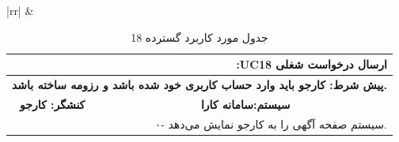 \documentclass[12pt]{article}
\begin{document}
\begin{center}
\begin{table}[H]
\begin{tabular}{|rr|}
			                    &                                                                                                                                                          \\ \hline

		\end{tabular}
	\end{table}

	\begin{table}[H]
		\caption{جدول مورد کاربرد گسترده 18}
		\label{tab:ext-uc18}
		\begin{tabular}{|rr|}
			\hline
			\multicolumn{2}{|r|}{\textbf{:UC18 ارسال درخواست شغلی}}                                                                                                                                                                                                                                                                                                                                                    \\ \hline
			\multicolumn{2}{|r|}{\textbf{پیش شرط: کارجو باید وارد حساب کاربری خود شده باشد و رزومه ساخته باشد.}}                                                                                                                                                                                                                                                                                                                               \\ \hline
			\multicolumn{1}{|c|}{\textbf{کنشگر: کارجو}}                                                                                                                                        & \multicolumn{1}{c|}{\textbf{سیستم:سامانه کارا}}                                                                                                                                                                                               \\ \hline
			\multicolumn{1}{|l|}{\textbf{}}                                                                                                                                                    & ۰- سیستم صفحه آگهی را به کارجو نمایش می‌دهد.                                                                                                                                                                                                  \\ \hline

\end{tabular}
\end{table}
\end{center}
\end{document}
